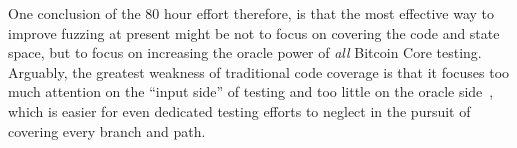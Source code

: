 One conclusion of the 80 hour effort therefore, is that the most
effective way to improve fuzzing at present might be not to focus on
covering the code and state space, but to focus on increasing the
oracle power of \emph{all} Bitcoin Core testing.  Arguably, the
greatest weakness of traditional code coverage is that it focuses too
much attention on the ``input side'' of testing and too little on the
oracle side~\cite{barr2014oracle}, which is easier for even dedicated
testing efforts to neglect in the pursuit of covering every branch and
path.
